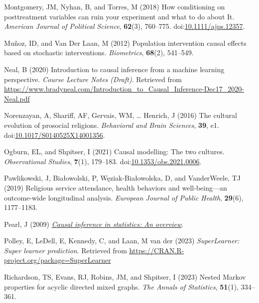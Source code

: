 \documentclass[
  single column]{article}
\newlength{\cslhangindent}
\newenvironment{CSLReferences}[2] %
 {\begin{list}{}{%
  \setlength{\itemindent}{0pt}
  \setlength{\leftmargin}{0pt}
  \setlength{\parsep}{0pt}
  \ifodd #1
   \setlength{\leftmargin}{\cslhangindent}
   \setlength{\itemindent}{-1\cslhangindent}
  \fi
  \setlength{\itemsep}{#2\baselineskip}}}
 {\end{list}}
\begin{document}
\begin{CSLReferences}{1}{0}
Montgomery, JM, Nyhan, B, and Torres, M (2018) How conditioning on
posttreatment variables can ruin your experiment and what to do about
It. \emph{American Journal of Political Science}, \textbf{62}(3),
760--775.
doi:\href{https://doi.org/10.1111/ajps.12357}{10.1111/ajps.12357}.

Muñoz, ID, and Van Der Laan, M (2012) Population intervention causal
effects based on stochastic interventions. \emph{Biometrics},
\textbf{68}(2), 541--549.

Neal, B (2020) Introduction to causal inference from a machine learning
perspective. \emph{Course Lecture Notes (Draft)}. Retrieved from
\url{https://www.bradyneal.com/Introduction_to_Causal_Inference-Dec17_2020-Neal.pdf}

Norenzayan, A, Shariff, AF, Gervais, WM, \ldots{} Henrich, J (2016) The
cultural evolution of prosocial religions. \emph{Behavioral and Brain
Sciences}, \textbf{39}, e1.
doi:\href{https://doi.org/10.1017/S0140525X14001356}{10.1017/S0140525X14001356}.

Ogburn, EL, and Shpitser, I (2021) Causal modelling: The two cultures.
\emph{Observational Studies}, \textbf{7}(1), 179--183.
doi:\href{https://doi.org/10.1353/obs.2021.0006}{10.1353/obs.2021.0006}.

Pawlikowski, J, Białowolski, P, Węziak-Białowolska, D, and VanderWeele,
TJ (2019) Religious service attendance, health behaviors and
well-being---an outcome-wide longitudinal analysis. \emph{European
Journal of Public Health}, \textbf{29}(6), 1177--1183.

Pearl, J (2009) \emph{\href{https://doi.org/10.1214/09-SS057}{Causal
inference in statistics: An overview}}.

Polley, E, LeDell, E, Kennedy, C, and Laan, M van der (2023)
\emph{SuperLearner: Super learner prediction}. Retrieved from
\url{https://CRAN.R-project.org/package=SuperLearner}

Richardson, TS, Evans, RJ, Robins, JM, and Shpitser, I (2023) Nested
{M}arkov properties for acyclic directed mixed graphs. \emph{The Annals
of Statistics}, \textbf{51}(1), 334--361.


\end{CSLReferences}
\end{document}
